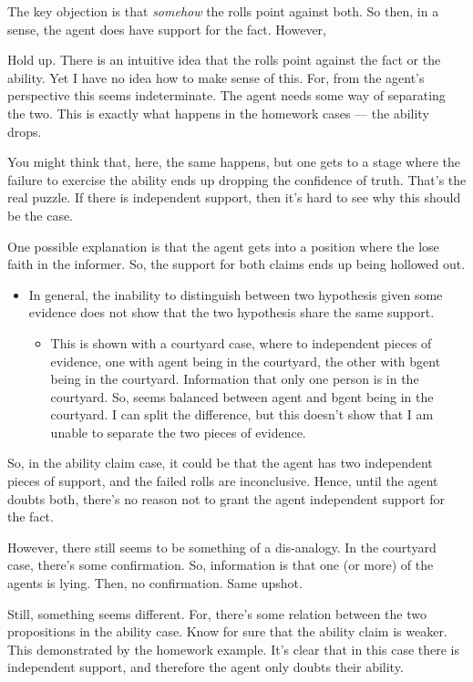 \documentclass[10pt]{article}
\begin{document}
\begin{note}
  The key objection is that \emph{somehow} the rolls point against both.
  So then, in a sense, the agent does have support for the fact.
  However,

  Hold up.
  There is an intuitive idea that the rolls point against the fact or the ability.
  Yet I have no idea how to make sense of this.
  For, from the agent's perspective this seems indeterminate.
  The agent needs some way of separating the two.
  This is exactly what happens in the homework cases --- the ability drops.

  You might think that, here, the same happens, but one gets to a stage where the failure to exercise the ability ends up dropping the confidence of truth.
  That's the real puzzle.
  If there is independent support, then it's hard to see why this should be the case.

  One possible explanation is that the agent gets into a position where the lose faith in the informer.
  So, the support for both claims ends up being hollowed out.

  \begin{itemize}
  \item In general, the inability to distinguish between two hypothesis given some evidence does not show that the two hypothesis share the same support.
    \begin{itemize}
    \item This is shown with a courtyard case, where to independent pieces of evidence, one with agent being in the courtyard, the other with bgent being in the courtyard.
      Information that only one person is in the courtyard.
      So, seems balanced between agent and bgent being in the courtyard.
      I can split the difference, but this doesn't show that I am unable to separate the two pieces of evidence.
    \end{itemize}
  \end{itemize}

  So, in the ability claim case, it could be that the agent has two independent pieces of support, and the failed rolls are inconclusive.
  Hence, until the agent doubts both, there's no reason not to grant the agent independent support for the fact.

  However, there still seems to be something of a dis-analogy.
  In the courtyard case, there's some confirmation.
  So, information is that one (or more) of the agents is lying.
  Then, no confirmation.
  Same upshot.

  Still, something seems different.
  For, there's some relation between the two propositions in the ability case.
  Know for sure that the ability claim is weaker.
  This demonstrated by the homework example.
  It's clear that in this case there is independent support, and therefore the agent only doubts their ability.


\end{note}
\end{document}
